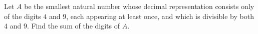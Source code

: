 Let $A$ be the smallest natural number whose decimal representation consists only of the digits $4$ and $9$, each appearing at least once, and which is divisible by both $4$ and $9$. Find the sum of the digits of $A$.
